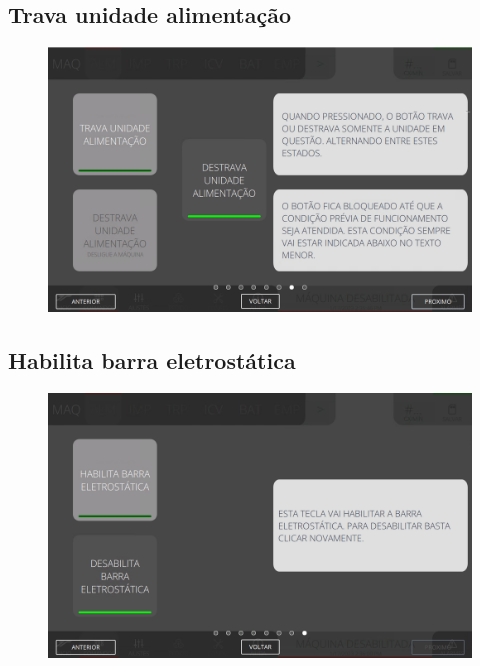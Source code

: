 \subsection{Trava unidade alimentação}
\begin{figure}
    \centering
    \includegraphics[width=576 px,height=360 px]{src/imagesICV/03-feeder/commands/8.png}
\end{figure}
\newpage
\thispagestyle{fancy}
\vspace{\fill}

\subsection{Habilita barra eletrostática}
\begin{figure}
    \centering
    \includegraphics[width=576 px,height=360 px]{src/imagesICV/03-feeder/commands/9.png}
\end{figure}